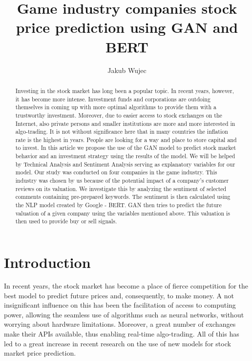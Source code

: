 \documentclass[11pt]{article} %
\title{Game industry companies stock price prediction using GAN and BERT}
\author{Jakub Wujec}
\begin{document}
\maketitle


\begin{abstract}
Investing in the stock market has long been a popular topic. In recent years, however, it has become more intense. Investment funds and corporations are outdoing themselves in coming up with more optimal algorithms to provide them with a trustworthy investment. Moreover, due to easier access to stock exchanges on the Internet, also private persons and smaller institutions are more and more interested in algo-trading. It is not without significance here that in many countries the inflation rate is the highest in years. People are looking for a way and place to store capital and to invest. In this article we propose the use of the GAN model to predict stock market behavior and an investment strategy using the results of the model. We will be helped by Technical Analysis and Sentiment Analysis serving as explanatory variables for our model. Our study was conducted on four companies in the game industry. This industry was chosen by us because of the potential impact of a company's customer reviews on its valuation. We investigate this by analyzing the sentiment of selected comments containing pre-prepared keywords. The sentiment is then calculated using the NLP model created by Google - BERT. GAN then tries to predict the future valuation of a given company using the variables mentioned above. This valuation is then used to provide buy or sell signals.  
\end{abstract}

\section{Introduction}
In recent years, the stock market has become a place of fierce competition for the best model to predict future prices and, consequently, to make money. 
A not insignificant influence on this has been the facilitation of access to computing power, allowing the seamless use of algorithms such as neural networks, without worrying about hardware limitations. Moreover, a great number of exchanges make their APIs available, thus enabling real-time algo-trading. All of this has led to a great increase in recent research on the use of new models for stock market price prediction.  \\
\end{document}
